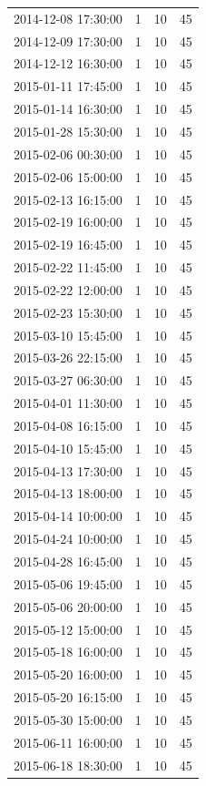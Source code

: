 \begin{tabular}{lrrr}
2014-12-08 17:30:00 & 1 & 10 & 45 \\
2014-12-09 17:30:00 & 1 & 10 & 45 \\
2014-12-12 16:30:00 & 1 & 10 & 45 \\
2015-01-11 17:45:00 & 1 & 10 & 45 \\
2015-01-14 16:30:00 & 1 & 10 & 45 \\
2015-01-28 15:30:00 & 1 & 10 & 45 \\
2015-02-06 00:30:00 & 1 & 10 & 45 \\
2015-02-06 15:00:00 & 1 & 10 & 45 \\
2015-02-13 16:15:00 & 1 & 10 & 45 \\
2015-02-19 16:00:00 & 1 & 10 & 45 \\
2015-02-19 16:45:00 & 1 & 10 & 45 \\
2015-02-22 11:45:00 & 1 & 10 & 45 \\
2015-02-22 12:00:00 & 1 & 10 & 45 \\
2015-02-23 15:30:00 & 1 & 10 & 45 \\
2015-03-10 15:45:00 & 1 & 10 & 45 \\
2015-03-26 22:15:00 & 1 & 10 & 45 \\
2015-03-27 06:30:00 & 1 & 10 & 45 \\
2015-04-01 11:30:00 & 1 & 10 & 45 \\
2015-04-08 16:15:00 & 1 & 10 & 45 \\
2015-04-10 15:45:00 & 1 & 10 & 45 \\
2015-04-13 17:30:00 & 1 & 10 & 45 \\
2015-04-13 18:00:00 & 1 & 10 & 45 \\
2015-04-14 10:00:00 & 1 & 10 & 45 \\
2015-04-24 10:00:00 & 1 & 10 & 45 \\
2015-04-28 16:45:00 & 1 & 10 & 45 \\
2015-05-06 19:45:00 & 1 & 10 & 45 \\
2015-05-06 20:00:00 & 1 & 10 & 45 \\
2015-05-12 15:00:00 & 1 & 10 & 45 \\
2015-05-18 16:00:00 & 1 & 10 & 45 \\
2015-05-20 16:00:00 & 1 & 10 & 45 \\
2015-05-20 16:15:00 & 1 & 10 & 45 \\
2015-05-30 15:00:00 & 1 & 10 & 45 \\
2015-06-11 16:00:00 & 1 & 10 & 45 \\
2015-06-18 18:30:00 & 1 & 10 & 45 \\

\end{tabular}
